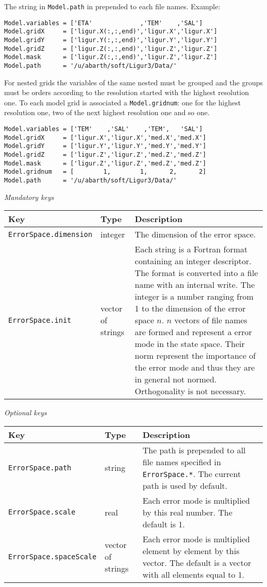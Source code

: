 \documentclass[a4paper,12pt]{article}
\newcommand{\code}{\texttt}
\newenvironment{keytabular}{\begin{tabular}{|p{0.3\textwidth}|p{0.2\textwidth}|p{0.5\textwidth}|} \hline Key & Type & Description \\ \hline \hline }{\end{tabular}}
\newcommand{\subsubsubsection}[1]{\bigskip \textit{#1} \medskip}
\begin{document}
The string in \code{Model.path} in prepended to each file names.
Example:


\begin{verbatim}
Model.variables = ['ETA'             ,'TEM'    ,'SAL'] 
Model.gridX     = ['ligur.X(:,:,end)','ligur.X','ligur.X'] 
Model.gridY     = ['ligur.Y(:,:,end)','ligur.Y','ligur.Y'] 
Model.gridZ     = ['ligur.Z(:,:,end)','ligur.Z','ligur.Z'] 
Model.mask      = ['ligur.Z(:,:,end)','ligur.Z','ligur.Z'] 
Model.path      = '/u/abarth/soft/Ligur3/Data/' 
\end{verbatim}

{%
For nested grids the variables of the same nested must be grouped
and the groups must be orders according to the resolution started with
the highest resolution one. To each model grid is associated a
\code{Model.gridnum}: one for the highest resolution one, two of the
next highest resolution one and so one.

\begin{verbatim} 
Model.variables = ['TEM'    ,'SAL'    ,'TEM',   'SAL'] 
Model.gridX     = ['ligur.X','ligur.X','med.X','med.X'] 
Model.gridY     = ['ligur.Y','ligur.Y','med.Y','med.Y'] 
Model.gridZ     = ['ligur.Z','ligur.Z','med.Z','med.Z'] 
Model.mask      = ['ligur.Z','ligur.Z','med.Z','med.Z'] 
Model.gridnum   = [        1,        1,      2,      2] 
Model.path      = '/u/abarth/soft/Ligur3/Data/' 
\end{verbatim}}

\subsubsubsection{Mandatory keys}

\begin{keytabular}
\code{ErrorSpace.dimension} & integer & The dimension of the error space.
\\
\code{ErrorSpace.init} & vector of strings &
Each string is a Fortran format containing an integer descriptor. The format is converted into a
file name with an internal write. The integer is a number ranging from 1
to the dimension of the error space $n$. $n$ vectors of file names are
formed and represent a error mode in the state space. Their norm
represent the importance of the error mode and thus they are in
general not normed. Orthogonality is not necessary.
\\
\hline
\end{keytabular}

\subsubsubsection{Optional keys}

\begin{keytabular}
\code{ErrorSpace.path} & string &  The path is prepended to all file names
specified in \code{ErrorSpace.*}. The current path is used by default.
\\
\code{ErrorSpace.scale} & real &
Each error mode is multiplied by this real number. The default is 1.
\\
\code{ErrorSpace.spaceScale} & vector of strings &
Each error mode is multiplied element by element by this vector. The
default is a vector with all elements equal to 1.
\\
\hline
\end{keytabular}
\end{document}
